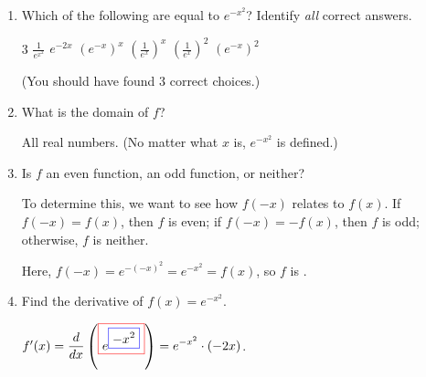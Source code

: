 \documentclass{article}
\begin{document}
\begin{enumerate}
  \begin{enumerate}

  \item Which of the following are equal to $e^{-x^2}$?  Identify
    \emph{all} correct answers.  
      \begin{enumerate}[label=\protect\maybecircle{\roman*.}]
      \begin{multicols}{3}
      \circleitem $\frac{1}{e^{x^2}}$
      \plainitem $e^{-2x}$
      \circleitem $(e^{-x})^x$ 
      \circleitem $\left({\frac{1}{e^x}}\right)^x$
      \plainitem $\left(\frac{1}{e^x}\right)^2$
      \plainitem $(e^{-x})^2$
      \end{multicols}
      \end{enumerate}      
    (You should have found 3 correct choices.)

  \item
    \begin{problem}[\vfill]
      What is the domain of $f$?
    \end{problem}

    \begin{solution}
      All real numbers.  (No matter what $x$ is, $e^{-x^2}$ is defined.) 
    \end{solution}

  \item
    \begin{problem}[\vfill]
      Is $f$ an even function, an odd function, or neither?
    \end{problem}

    \begin{solution}
     To determine this, we want to see how $f(-x)$ relates to
        $f(x)$.  If $f(-x) = f(x)$, then $f$ is even; if $f(-x) = -f(x)$,
        then $f$ is odd; otherwise, $f$ is neither.

      Here, $f(-x) = e^{-(-x)^2} = e^{-x^2} = f(x)$, so $f$ is
      .
    \end{solution}

  \item
    \begin{problem}[\stretch{2}]
      Find the derivative of $f(x) = e^{-x^2}$. 
    \end{problem}

    \begin{solution}
      $f'(x) = \displaystyle \frac{d}{dx}
      \left(\fcolorbox{red}{white}{$\displaystyle e^ {
            \fcolorbox{blue}{white}{$\displaystyle -x^ { 2} $}} $}\right)
      = {} e^ { -x^ { 2} } \cdot \left(-2 x\right)$.
    \end{solution}    


\end{enumerate}
\end{enumerate}
\end{document}
